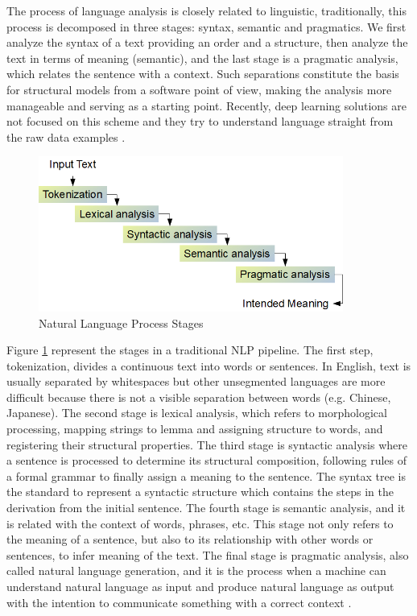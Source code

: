 \documentclass[12pt]{report}
\begin{document}
The process of language analysis is closely related to linguistic, traditionally, this process is decomposed in three stages: syntax, semantic and pragmatics. We first analyze the syntax of a text providing an order and a structure, then  analyze  the text in terms of meaning (semantic), and the last stage is a pragmatic analysis, which relates the sentence with a context. Such separations constitute the basis for structural models from a software point of view, making the analysis more manageable and serving as a starting point. Recently, deep learning solutions are not focused on this scheme and they try to understand language straight from the raw data examples \cite{Indurkhya2010}.

\begin{figure}[H]	
	\centering
	\includegraphics[width=100mm, scale = 1]{images/4_nlp.png}	
	\caption{Natural Language Process Stages}	
	\label{figure:NLP_Stages}
\end{figure}

Figure \ref{figure:NLP_Stages} represent the stages in a  traditional \ac{NLP} pipeline. The first step, tokenization,  divides a continuous text  into words or sentences. In English, text is usually separated by whitespaces but other unsegmented languages are more difficult because there is not a visible separation between words (e.g. Chinese, Japanese). The second stage is lexical analysis, which refers to morphological processing, mapping strings to lemma and assigning structure to words, and registering their structural properties. The third stage is syntactic analysis where a sentence is processed to determine its structural composition, following rules of a formal grammar to finally assign a meaning to the sentence. The syntax tree is the standard to represent a syntactic structure which contains the steps in the derivation from the initial sentence. The fourth stage is semantic analysis, and it is related with the context of words, phrases, etc. This stage not only refers to the meaning of a sentence, but also to its relationship with other words or sentences, to infer meaning of the text. The final stage is pragmatic analysis, also called natural language generation, and  it is the process when a machine can understand natural language as input and produce natural language as output with the intention to communicate something with a correct context \cite{ Indurkhya2010}.
\end{document}
